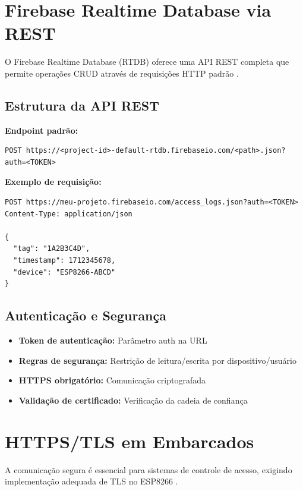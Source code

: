 \section{Firebase Realtime Database via REST}
\label{sec:firebase-rtdb}

O Firebase Realtime Database (RTDB) oferece uma API REST completa que permite operações CRUD através de requisições HTTP padrão \cite{firebase-rtdb}.

\subsection{Estrutura da API REST}

\textbf{Endpoint padrão:}
\begin{verbatim}
POST https://<project-id>-default-rtdb.firebaseio.com/<path>.json?auth=<TOKEN>
\end{verbatim}

\textbf{Exemplo de requisição:}
\begin{verbatim}
POST https://meu-projeto.firebaseio.com/access_logs.json?auth=<TOKEN>
Content-Type: application/json

{
  "tag": "1A2B3C4D",
  "timestamp": 1712345678,
  "device": "ESP8266-ABCD"
}
\end{verbatim}

\subsection{Autenticação e Segurança}

\begin{itemize}
\item \textbf{Token de autenticação:} Parâmetro auth na URL
\item \textbf{Regras de segurança:} Restrição de leitura/escrita por dispositivo/usuário
\item \textbf{HTTPS obrigatório:} Comunicação criptografada
\item \textbf{Validação de certificado:} Verificação da cadeia de confiança
\end{itemize}

\section{HTTPS/TLS em Embarcados}
\label{sec:https-tls}

A comunicação segura é essencial para sistemas de controle de acesso, exigindo implementação adequada de TLS no ESP8266 \cite{mdn-https,esp8266-bearssl}.

